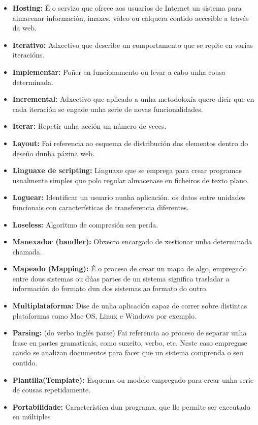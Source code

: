 \begin{itemize}
    \item \textbf{Hosting:} É o servizo que ofrece aos usuarios de Internet un sistema para almacenar 
        información, imaxes, vídeo ou calquera contido accesible a través da web.    
    \item \textbf{Iterativo:} Adxectivo que describe un comportamento que se repite en varias iteracións. 
    \item \textbf{Implementar:} Poñer en funcionamento ou levar a cabo unha cousa determinada.    
    \item \textbf{Incremental:} Adxectivo que aplicado a unha metodoloxía quere dicir que en cada iteración
        se engade unha serie de novas funcionalidades. 
    \item \textbf{Iterar:} Repetir unha acción un número de veces. 
    \item \textbf{Layout:} Fai referencia ao esquema de distribución dos elementos dentro do deseño dunha 
        páxina web.
    \item \textbf{Linguaxe de scripting:} Linguaxe que se emprega para crear programas usualmente simples
        que polo regular almacenase en ficheiros de texto plano.
    \item \textbf{Loguear:} Identificar un usuario nunha aplicación.
        os datos entre unidades funcionais con características de transferencia diferentes.
    \item \textbf{Loseless:} Algoritmo de compresión sen perda.
    \item \textbf{Manexador (handler):} Obxecto encargado de xestionar unha determinada chamada.    
    \item \textbf{Mapeado (Mapping):} É o proceso de crear un mapa de algo, empregado entre dous sistemas ou
        dúas partes de un sistema significa trasladar a información do formato dun dos sistemas ao 
        formato do outro.
    \item \textbf{Multiplataforma:} Dise de unha aplicación capaz de correr sobre distintas plataformas como
        Mac OS, Linux e Windows por exemplo.
    \item \textbf{Parsing:} (do verbo inglés parse) Fai referencia ao proceso de separar unha frase en partes
        gramaticais, como suxeito, verbo, etc. Neste caso empregase cando se analizan documentos 
        para facer que un sistema comprenda o seu contido.
    \item \textbf{Plantilla(Template):} Esquema ou modelo empregado para crear unha serie de cousas 
        repetidamente.    
    \item \textbf{Portabilidade:} Característica dun programa, que lle permite ser executado en múltiples 

\end{itemize}
